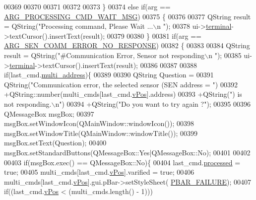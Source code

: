 \begin{DoxyCode}
{00369 
00370 
00371 
00372 
00373        \}
00374        \textcolor{keywordflow}{else} \textcolor{keywordflow}{if}(arg == \hyperlink{a00034_a89228259ebf351e938853637ef163a1b}{ARG\_PROCESSING\_CMD\_WAIT\_MSG})
00375        \{
00376 
00377                 QString result =  QString(\textcolor{stringliteral}{"Processing command, Please Wait ...\(\backslash\)n "});
00378                 ui->\hyperlink{a00027_aae71c46ea4546df5994735dee573b2dd}{terminal}->textCursor().insertText(result);
00379 
00380        \}
00381        \textcolor{keywordflow}{if}(arg == \hyperlink{a00034_a5f745a08fe4d5a8336a8fd62c30e0642}{ARG\_SEN\_COMM\_ERROR\_NO\_RESPONSE})
00382        \{
00383 
00384             QString result =  QString(\textcolor{stringliteral}{"#Communication Error, Sensor not responding\(\backslash\)n "});
00385             ui->\hyperlink{a00027_aae71c46ea4546df5994735dee573b2dd}{terminal}->textCursor().insertText(result);
00386 
00387 
00388                 \textcolor{keywordflow}{if}(last\_cmd.\hyperlink{a00001_a8e69b971c61ced27a7567efd2bf0db59}{multi\_address})\{
00389 
00390                     QString Question =
00391                             QString(\textcolor{stringliteral}{"Communication error, the selected sensor (SEN address = "})
00392                             +QString::number(multi\_cmds[last\_cmd.\hyperlink{a00001_a2b48b371fd84be2a8ad581b1ad708b88}{vPos}].address)
00393                             +QString(\textcolor{stringliteral}{") is not responding.\(\backslash\)n"})
00394                             +QString(\textcolor{stringliteral}{"Do you want to try again ?"});
00395 
00396                     QMessageBox msgBox;
00397                     msgBox.setWindowIcon(QMainWindow::windowIcon());
00398                     msgBox.setWindowTitle(QMainWindow::windowTitle());
00399                     msgBox.setText(Question);
00400                     msgBox.setStandardButtons(QMessageBox::Yes|QMessageBox::No);
00401 
00402 
00403                     \textcolor{keywordflow}{if}(msgBox.exec() == QMessageBox::No)\{
00404                     last\_cmd.\hyperlink{a00001_a3e88f779da9798a5da7dda227e2ca388}{processed} = \textcolor{keyword}{true};
00405                     multi\_cmds[last\_cmd.\hyperlink{a00001_a2b48b371fd84be2a8ad581b1ad708b88}{vPos}].varified = \textcolor{keyword}{true};
00406                     multi\_cmds[last\_cmd.\hyperlink{a00001_a2b48b371fd84be2a8ad581b1ad708b88}{vPos}].gui.pBar->setStyleSheet(
      \hyperlink{a00034_aa9f43b2774395af6510910f8feed7cb4}{PBAR\_FAILURE});
00407                     \textcolor{keywordflow}{if}((last\_cmd.\hyperlink{a00001_a2b48b371fd84be2a8ad581b1ad708b88}{vPos} < (multi\_cmds.length() - 1)))
}
\end{DoxyCode}
